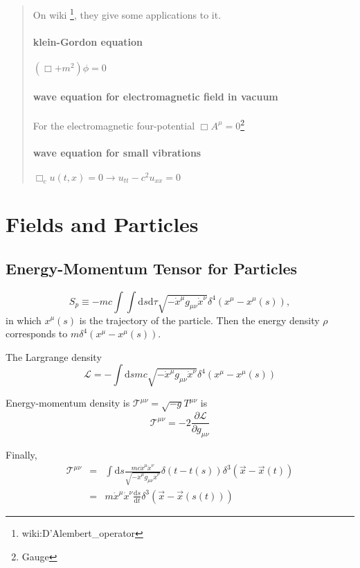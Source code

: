 \documentclass[11pt]{book}
\begin{document}
\begin{quotation}
On wiki \footnote{wiki:D'Alembert\_operator}, they give some applications to it.
\paragraph{klein-Gordon equation} $(\Box+m^2)\phi=0$
\paragraph{wave equation for electromagnetic field in vacuum} For the electromagnetic four-potential $\Box A^\mu=0$\footnote{Gauge}
\paragraph{wave equation for small vibrations} $\Box_c u(t,x)=0\rightarrow u_{tt}-c^2 u_{xx}=0$
\end{quotation}




\section{Fields and Particles}

\subsection{Energy-Momentum Tensor for Particles}

\begin{equation}
S_p \equiv -m c \int \int \mathrm d s\mathrm d\tau \sqrt{-\dot x ^\mu g_{\mu\nu} \dot x^\nu} \delta^4(x^\mu - x^\mu (s))    ,
\end{equation}
in which $x^\mu(s)$ is the trajectory of the particle. Then the energy density $\rho$ corresponds to $m\delta^4(x^\mu- x^\mu(s))$.

The Largrange density
\begin{equation}
\mathcal L = -\int\mathrm ds mc \sqrt{-\dot x^\mu g_{\mu\nu}\dot x^\nu}\delta^4(x^\mu - x^\mu(s))
\end{equation}

Energy-momentum density is $\mathcal T^{\mu\nu} = \sqrt{-g}T^{\mu\nu}$ is
\begin{equation} 
\mathcal T^{\mu\nu} = -2 \frac{\partial \mathcal L}{\partial g_{\mu\nu}}
\end{equation}

Finally,
\begin{eqnarray}
\mathcal T^{\mu\nu} &=& \int \mathrm ds \frac{mc\dot x^\mu \dot x^\nu}{\sqrt{-\dot x^\mu g_{\mu\nu} \dot x^\nu}} \delta(t-t(s))\delta^3(\vec x - \vec x(t)) \\
&=& m\dot x^\mu \dot x^\nu \frac{\mathrm d s}{\mathrm d t} \delta^3(\vec x - \vec x(s(t)))
\end{eqnarray}
\end{document}
